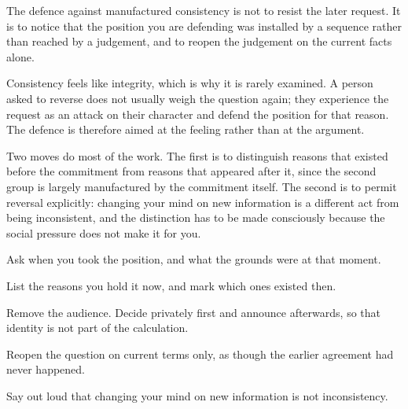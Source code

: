 


\begin{core}
The defence against manufactured consistency is not to resist the later request. It is to notice that the position you are defending was installed by a sequence rather than reached by a judgement, and to reopen the judgement on the current facts alone.
\end{core}

\begin{mechanism}
Consistency feels like integrity, which is why it is rarely examined. A person asked to reverse does not usually weigh the question again; they experience the request as an attack on their character and defend the position for that reason. The defence is therefore aimed at the feeling rather than at the argument.

Two moves do most of the work. The first is to distinguish reasons that existed before the commitment from reasons that appeared after it, since the second group is largely manufactured by the commitment itself. The second is to permit reversal explicitly: changing your mind on new information is a different act from being inconsistent, and the distinction has to be made consciously because the social pressure does not make it for you.
\end{mechanism}

\begin{application}
  \item Ask when you took the position, and what the grounds were at that moment.
  \item List the reasons you hold it now, and mark which ones existed then.
  \item Remove the audience. Decide privately first and announce afterwards, so that identity is not part of the calculation.
  \item Reopen the question on current terms only, as though the earlier agreement had never happened.
  \item Say out loud that changing your mind on new information is not inconsistency.
\end{application}

